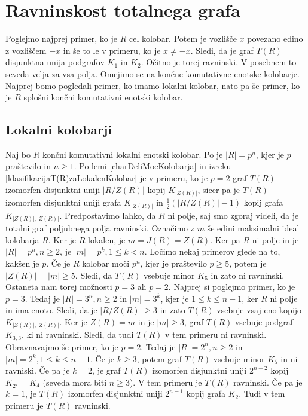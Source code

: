 \documentclass[a4paper, 12pt]{amsart}
\theoremstyle{definition} %
\theoremstyle{plain} %
\begin{document}
\section{Ravninskost totalnega grafa}

Poglejmo najprej primer, ko je $R$ cel kolobar. Potem je vozlišče $x$ povezano edino z vozliščem $-x$ in še to le v primeru, ko je $x\neq -x$. Sledi, da je graf $T(R)$ disjunktna unija podgrafov $K_1$ in $K_2$. Očitno je torej ravninski. V posebnem to seveda velja za vsa polja. Omejimo se na končne komutativne enotske kolobarje.  Najprej bomo pogledali primer, ko imamo lokalni kolobar, nato pa še primer, ko je $R$ splošni končni komutativni enotski kolobar.

\subsection{Lokalni kolobarji}

Naj bo $R$ končni komutativni lokalni enotski kolobar. Po \cite[Posledica 2.4]{diploma} je $|R| = p^n$, kjer je $p$ praštevilo in $n\ge 1$. Po lemi \ref{charDeliMocKolobarja} in izreku \ref{klasifikacijaT(R)zaLokalenKolobar} je v primeru, ko je $p=2$ graf $T(R)$ izomorfen disjunktni uniji $|R/Z(R)|$ kopij $K_{|Z(R)|}$, sicer pa je $T(R)$ izomorfen disjunktni uniji grafa $K_{|Z(R)|}$ in $\frac{1}{2}(|R/Z(R)| - 1)$ kopij grafa $K_{|Z(R)|,|Z(R)|}$.
Predpostavimo lahko, da $R$ ni polje, saj smo zgoraj videli, da je totalni graf poljubnega polja ravninski. Označimo z $m$ še edini maksimalni ideal kolobarja $R$. Ker je $R$ lokalen, je $m=J(R) = Z(R)$. Ker pa $R$ ni polje in je $|R|=p^n, n \ge 2$, je  $|m| = p^k, 1\le k < n$. Ločimo nekaj primerov glede na to, kakšen je $p$. Če je $R$ kolobar moči $p ^n$, kjer je praštevilo $p\ge5$, potem je $|Z(R)| = |m| \ge 5$. Sledi, da $T(R)$ vsebuje minor $K_5$ in  zato ni ravninski. Ostaneta nam torej možnosti $p=3$ ali $p=2$. Najprej si poglejmo primer, ko je $p=3$. Tedaj je $|R|= 3^n, n\ge  2$ in $|m| = 3^k$, kjer je $1\le k \le n-1$, ker $R$ ni polje in ima enoto. Sledi, da je $|R/Z(R)| \ge 3$ in zato $T(R)$ vsebuje vsaj eno kopijo $K_{|Z(R)|,|Z(R)|}$. Ker je $Z(R)= m$ in je $|m| \ge 3$, graf $T(R)$ vsebuje podgraf $K_{3,3}$, ki ni ravninski. Sledi, da tudi $T(R)$ v tem primeru ni ravninski. Obravnavajmo še primer, ko je $p=2$. Tedaj je $|R| = 2^n, n\ge 2$ in $|m| = 2^k, 1 \le k \le n-1$. Če je $k\ge 3$, potem graf $T(R)$ vsebuje minor $K_5$ in ni ravniski. Če pa je $k=2$, je graf $T(R)$ izomorfen disjunktni uniji $2^{n-2}$ kopij $K_{2^2} = K_4$ (seveda mora biti $n\ge 3$). V tem primeru je $T(R)$ ravninski. Če pa je $k=1$, je $T(R)$ izomorfen disjunktni uniji $2^{n-1}$ kopij grafa $K_2$. Tudi v tem primeru je $T(R)$ ravninski. 
\end{document}
